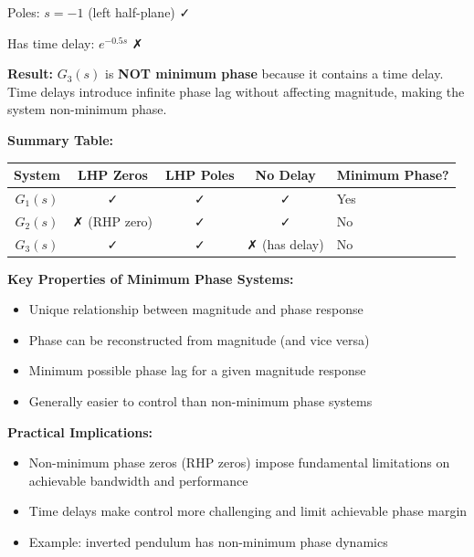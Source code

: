 \documentclass[11pt,a4paper]{article}
\begin{document}
Poles: $s = -1$ (left half-plane) ✓

Has time delay: $e^{-0.5s}$ ✗

\textbf{Result:} $G_3(s)$ is \textbf{NOT minimum phase} because it contains a time delay. Time delays introduce infinite phase lag without affecting magnitude, making the system non-minimum phase.

\textbf{Summary Table:}

\begin{center}
\begin{tabular}{|c|c|c|c|}
\hline
System & LHP Zeros & LHP Poles & No Delay & Minimum Phase? \\
\hline
$G_1(s)$ & ✓ & ✓ & ✓ & Yes \\
$G_2(s)$ & ✗ (RHP zero) & ✓ & ✓ & No \\
$G_3(s)$ & ✓ & ✓ & ✗ (has delay) & No \\
\hline
\end{tabular}
\end{center}

\textbf{Key Properties of Minimum Phase Systems:}
\begin{itemize}
\item Unique relationship between magnitude and phase response
\item Phase can be reconstructed from magnitude (and vice versa)
\item Minimum possible phase lag for a given magnitude response
\item Generally easier to control than non-minimum phase systems
\end{itemize}

\textbf{Practical Implications:}
\begin{itemize}
\item Non-minimum phase zeros (RHP zeros) impose fundamental limitations on achievable bandwidth and performance
\item Time delays make control more challenging and limit achievable phase margin
\item Example: inverted pendulum has non-minimum phase dynamics
\end{itemize}
\end{document}

